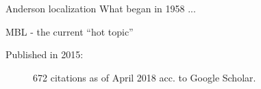 \documentclass[1pt]{beamer}
\begin{document}
\begin{frame}{Anderson localization}
What began in 1958 ...
\end{frame}
\begin{frame}{MBL - the current ``hot topic''}
\begin{minipage}[c]{0.6\textwidth}
Published in 2015:
\begin{figure}
\caption{672 citations as of April 2018 acc. to Google Scholar.}
\end{figure}
\end{minipage}
\end{frame}
\end{document}
